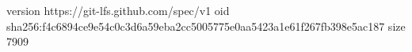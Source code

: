 version https://git-lfs.github.com/spec/v1
oid sha256:f4c6894ce9e54c0c3d6a59eba2cc5005775e0aa5423a1e61f267fb398e5ac187
size 7909
